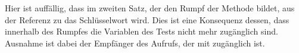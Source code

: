 Hier ist auffällig, dass im zweiten Satz, der den Rumpf der Methode bildet,
aus der Referenz zu  das Schlüsselwort  wird.
Dies ist eine Konsequenz dessen, dass innerhalb des Rumpfes die Variablen des Tests nicht mehr zugänglich sind.
Ausnahme ist dabei der Empfänger des Aufrufs, der mit  zugänglich ist.


